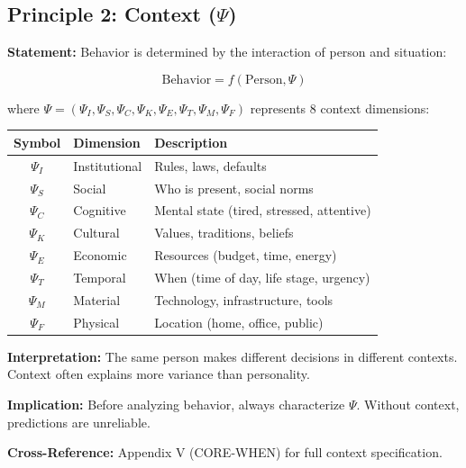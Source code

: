 \subsection{Principle 2: Context ($\Psi$)}

\begin{tcolorbox}[colback=gray!5!white, colframe=gray!75!black,
    title=Axiom PR-2: Context Primacy]

\textbf{Statement:} Behavior is determined by the interaction of person and situation:

\begin{equation}
\text{Behavior} = f(\text{Person}, \Psi)
\end{equation}

where $\Psi = (\Psi_I, \Psi_S, \Psi_C, \Psi_K, \Psi_E, \Psi_T, \Psi_M, \Psi_F)$ represents 8 context dimensions:

\begin{table}[H]
\centering
\renewcommand{\arraystretch}{1.3}
\begin{tabular}{@{}cll@{}}
\toprule
\textbf{Symbol} & \textbf{Dimension} & \textbf{Description} \\
\midrule
$\Psi_I$ & Institutional & Rules, laws, defaults \\
$\Psi_S$ & Social & Who is present, social norms \\
$\Psi_C$ & Cognitive & Mental state (tired, stressed, attentive) \\
$\Psi_K$ & Cultural & Values, traditions, beliefs \\
$\Psi_E$ & Economic & Resources (budget, time, energy) \\
$\Psi_T$ & Temporal & When (time of day, life stage, urgency) \\
$\Psi_M$ & Material & Technology, infrastructure, tools \\
$\Psi_F$ & Physical & Location (home, office, public) \\
\bottomrule
\end{tabular}
\end{table}

\textbf{Interpretation:} The same person makes different decisions in different contexts. Context often explains more variance than personality.

\textbf{Implication:} Before analyzing behavior, always characterize $\Psi$. Without context, predictions are unreliable.

\textbf{Cross-Reference:} Appendix V (CORE-WHEN) for full context specification.

\end{tcolorbox}


